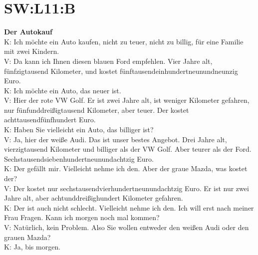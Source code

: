 \section{SW:L11:B}
\noindent
\textbf{Der Autokauf} \\
K: Ich möchte ein Auto kaufen, nicht zu teuer, nicht zu billig, für eine Familie mit zwei Kindern. \\
V: Da kann ich Ihnen diesen blauen Ford empfehlen. 
Vier Jahre alt, fünfzigtausend Kilometer, und kostet fünftausendeinhundertneunundneunzig Euro. \\
K: Ich möchte ein Auto, das neuer ist.  \\
V: Hier der rote VW Golf.  Er ist zwei Jahre alt, ist weniger Kilometer gefahren, nur fünfunddreißigtausend Kilometer, aber teuer. Der kostet achttausendfünfhundert Euro. \\
K: Haben Sie vielleicht ein Auto, das billiger ist? \\
V: Ja, hier der weiße Audi. Das ist unser bestes Angebot. Drei Jahre alt, vierzigtausend Kilometer und billiger als der VW Golf. Aber teurer als der Ford. Sechstausendsiebenhundertneunundachtzig Euro. \\
K: Der gefällt mir. Vielleicht nehme ich den. Aber der graue Mazda, was kostet der? \\
V: Der kostet nur sechstausendvierhundertneunundachtzig Euro. Er ist nur zwei Jahre alt, aber achtunddreißighundert Kilometer gefahren. \\
K: Der ist auch nicht schlecht. Vielleicht nehme ich den. Ich will erst nach meiner Frau Fragen.  Kann ich morgen noch mal kommen? \\
V: Natürlich, kein Problem. Also Sie wollen entweder den weißen Audi oder den grauen Mazda?  \\
K: Ja, bis morgen.

